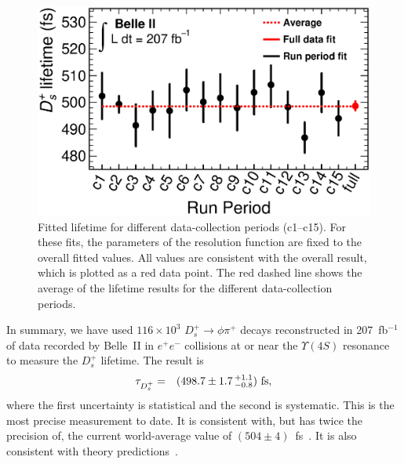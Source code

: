 \documentclass[aps,prl,twocolumn,superscriptaddress,showpacs,preprintnumbers,amsmath,amssymb]{revtex4-2}
\def\ra{\!\rightarrow\!}
\begin{document}
\begin{figure}[ht]
    \centering
    \includegraphics[scale=0.41]{exp_split_fit_res.eps}
    \caption{
    Fitted lifetime for different data-collection periods (c1--c15). 
    For these fits, the parameters of the resolution
    function are fixed to the overall fitted values.
    All values are consistent with the overall result, which is plotted 
    as a red data point. The red dashed line shows the average of the
    lifetime results for the different data-collection periods.
    }
    \label{fig:run_period}
\end{figure}

In summary, we have used $116\times 10^3$ $D_s^+\ra\phi\pi^+$ decays 
reconstructed in 207~fb$^{-1}$ of data recorded by Belle~II 
in $e^+e^-$ collisions at or near the $\Upsilon(4S)$ resonance 
to measure the $D_s^+$ lifetime. The result is
\begin{eqnarray}
\tau^{}_{D^+_s} & = & (498.7 \pm 1.7\,^{+1.1}_{-0.8})~{\rm fs,}
\end{eqnarray}
where the first uncertainty is statistical and the second is systematic. 
This is the most precise measurement to date. It is consistent with, but 
has twice the precision of, the current world-average value of 
$(504\pm 4)$~fs~\cite{ParticleDataGroup:2022pth}. It is also consistent 
with theory predictions~\cite{Lenz:2014jha, PhysRevD.88.034004,Gratrex:2022xpm}.






\end{document}
